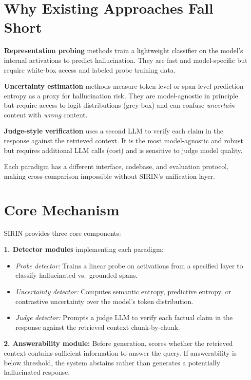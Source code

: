 \documentclass[10pt,twocolumn]{article}
\begin{document}
\section{Why Existing Approaches Fall Short}

\textbf{Representation probing} methods train a lightweight classifier on the model's
internal activations to predict hallucination. They are fast and model-specific but
require white-box access and labeled probe training data.

\textbf{Uncertainty estimation} methods measure token-level or span-level prediction
entropy as a proxy for hallucination risk. They are model-agnostic in principle but
require access to logit distributions (grey-box) and can confuse \emph{uncertain}
content with \emph{wrong} content.

\textbf{Judge-style verification} uses a second LLM to verify each claim in the response
against the retrieved context. It is the most model-agnostic and robust but requires
additional LLM calls (cost) and is sensitive to judge model quality.

Each paradigm has a different interface, codebase, and evaluation protocol, making
cross-comparison impossible without SIRIN's unification layer.

\section{Core Mechanism}

SIRIN provides three core components:

\textbf{1. Detector modules} implementing each paradigm:
\begin{itemize}[itemsep=1pt,parsep=0pt]
  \item \textit{Probe detector:} Trains a linear probe on activations from a
    specified layer to classify hallucinated vs.\ grounded spans.
  \item \textit{Uncertainty detector:} Computes semantic entropy, predictive entropy,
    or contrastive uncertainty over the model's token distribution.
  \item \textit{Judge detector:} Prompts a judge LLM to verify each factual claim
    in the response against the retrieved context chunk-by-chunk.
\end{itemize}

\textbf{2. Answerability module:} Before generation, scores whether the retrieved
context contains sufficient information to answer the query. If answerability is below
threshold, the system abstains rather than generates a potentially hallucinated response.
\end{document}
